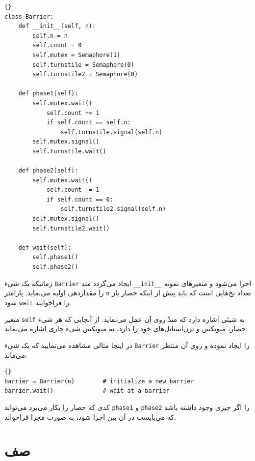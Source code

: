\documentclass{book}
\begin{document}
\begin{latin}
\begin{lstlisting}[title=\rl{کلاس \lr{Barrier} }]{}
class Barrier:
    def __init__(self, n):
        self.n = n
        self.count = 0
        self.mutex = Semaphore(1)
        self.turnstile = Semaphore(0)
        self.turnstile2 = Semaphore(0)

    def phase1(self):
        self.mutex.wait()
            self.count += 1
            if self.count == self.n:
                self.turnstile.signal(self.n) 
        self.mutex.signal()
        self.turnstile.wait()            

    def phase2(self):
        self.mutex.wait()
            self.count -= 1
            if self.count == 0:
                self.turnstile2.signal(self.n)
        self.mutex.signal()
        self.turnstile2.wait()

    def wait(self):
        self.phase1()
        self.phase2()
\end{lstlisting}
\end{latin}

    زمانیکه یک شیء \texttt{Barrier} ایجاد می‌گردد 
    متد \texttt{\_\_init\_\_} اجرا می‌شود و متغیرهای نمونه را مقداردهی اولیه می‌نماید. 
    پارامتر \texttt{n} تعداد نخ‌هایی است که باید پیش از اینکه حصار باز شود \texttt{wait}  را فراخوانند. 
    

    متغیر \texttt{self} به شیئی اشاره دارد که متدْ روی آن عمل می‌نماید. 
    از آنجایی که هر شیء حصار، میوتکس و ترن‌استایل‌های خود را دارد،  به میوتکس شیء جاری اشاره می‌نماید. 

    در اینجا مثالی مشاهده می‌نمایید که یک شیء \texttt{Barrier} را ایجاد نموده و روی آن منتظر می‌ماند:

\begin{latin}
\begin{lstlisting}[title={Barrier \rl{واسط}}]{}
barrier = Barrier(n)        # initialize a new barrier
barrier.wait()              # wait at a barrier
\end{lstlisting}
\end{latin}

        کدی که حصار را بکار می‌برد می‌تواند \texttt{phase1} و \texttt{phase2} را 
        اگر چیزی وجود داشته باشد که می‌بایست در آن بین اجرا شود، به صورت مجزا فراخواند. 


\section{صف}
\label{dancers}
\end{document}
